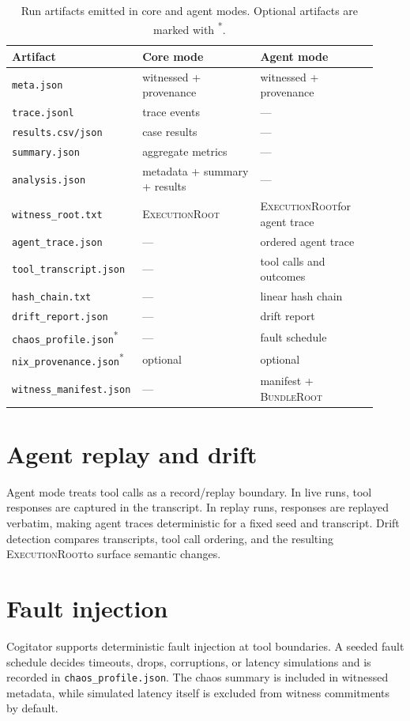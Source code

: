 \documentclass[11pt]{article}
\newcommand{\ExecutionRoot}{\textsc{ExecutionRoot}}
\newcommand{\BundleRoot}{\textsc{BundleRoot}}
\begin{document}
\begin{table}[t]
  \centering
  \caption{Run artifacts emitted in core and agent modes. Optional artifacts are marked
  with \textsuperscript{*}.}
  \label{tab:artifacts}
  \begin{tabular}{@{}p{0.28\linewidth}p{0.32\linewidth}p{0.32\linewidth}@{}}
    \toprule
    Artifact & Core mode & Agent mode \\
    \midrule
    \texttt{meta.json} & witnessed + provenance & witnessed + provenance \\
    \texttt{trace.jsonl} & trace events & --- \\
    \texttt{results.csv/json} & case results & --- \\
    \texttt{summary.json} & aggregate metrics & --- \\
    \texttt{analysis.json} & metadata + summary + results & --- \\
    \texttt{witness\_root.txt} & \ExecutionRoot & \ExecutionRoot for agent trace \\
    \texttt{agent\_trace.json} & --- & ordered agent trace \\
    \texttt{tool\_transcript.json} & --- & tool calls and outcomes \\
    \texttt{hash\_chain.txt} & --- & linear hash chain \\
    \texttt{drift\_report.json} & --- & drift report \\
    \texttt{chaos\_profile.json}\textsuperscript{*} & --- & fault schedule \\
    \texttt{nix\_provenance.json}\textsuperscript{*} & optional & optional \\
    \texttt{witness\_manifest.json} & --- & manifest + \BundleRoot \\
    \bottomrule
  \end{tabular}
\end{table}

\section{Agent replay and drift}
Agent mode treats tool calls as a record/replay boundary. In live runs, tool responses
are captured in the transcript. In replay runs, responses are replayed verbatim, making
agent traces deterministic for a fixed seed and transcript. Drift detection compares
transcripts, tool call ordering, and the resulting \ExecutionRoot to surface semantic
changes.

\section{Fault injection}
Cogitator supports deterministic fault injection at tool boundaries. A seeded fault
schedule decides timeouts, drops, corruptions, or latency simulations and is recorded
in \texttt{chaos\_profile.json}. The chaos summary is included in witnessed metadata,
while simulated latency itself is excluded from witness commitments by default.
\end{document}
